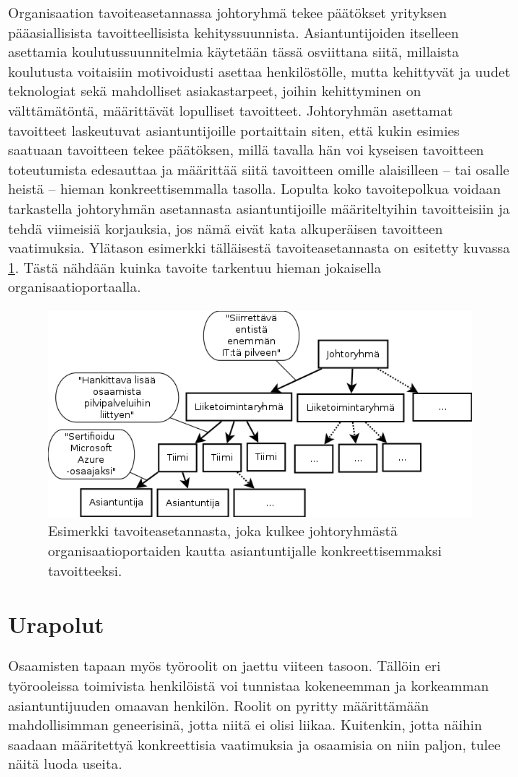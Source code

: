 \documentclass[a4paper,finnish,12pt]{article}
\begin{document}
Organisaation tavoiteasetannassa johtoryhmä tekee päätökset yrityksen pääasiallisista tavoitteellisista kehityssuunnista. Asiantuntijoiden itselleen asettamia koulutussuunnitelmia käytetään tässä osviittana siitä, millaista koulutusta voitaisiin motivoidusti asettaa henkilöstölle, mutta kehittyvät ja uudet teknologiat sekä mahdolliset asiakastarpeet, joihin kehittyminen on välttämätöntä, määrittävät lopulliset tavoitteet. Johtoryhmän asettamat tavoitteet laskeutuvat asiantuntijoille portaittain siten, että kukin esimies saatuaan tavoitteen tekee päätöksen, millä tavalla hän voi kyseisen tavoitteen toteutumista edesauttaa ja määrittää siitä tavoitteen omille alaisilleen -- tai osalle heistä -- hieman konkreettisemmalla tasolla. Lopulta koko tavoitepolkua voidaan tarkastella johtoryhmän asetannasta asiantuntijoille määriteltyihin tavoitteisiin ja tehdä viimeisiä korjauksia, jos nämä eivät kata alkuperäisen tavoitteen vaatimuksia. Ylätason esimerkki tälläisestä tavoiteasetannasta on esitetty kuvassa \ref{fig:tavoitesample}. Tästä nähdään kuinka tavoite tarkentuu hieman jokaisella organisaatioportaalla.

\begin{figure}[hb]
\centering
\includegraphics[width=1\textwidth]{tavoitesample.png}
\caption{Esimerkki tavoiteasetannasta, joka kulkee johtoryhmästä organisaatioportaiden kautta asiantuntijalle konkreettisemmaksi tavoitteeksi.}
\label{fig:tavoitesample}
\end{figure}

\subsection{Urapolut}

Osaamisten tapaan myös työroolit on jaettu viiteen tasoon. Tällöin eri työrooleissa toimivista henkilöistä voi tunnistaa kokeneemman ja korkeamman asiantuntijuuden omaavan henkilön. Roolit on pyritty määrittämään mahdollisimman geneerisinä, jotta niitä ei olisi liikaa. Kuitenkin, jotta näihin saadaan määritettyä konkreettisia vaatimuksia ja osaamisia on niin paljon, tulee näitä luoda useita.
\end{document}
